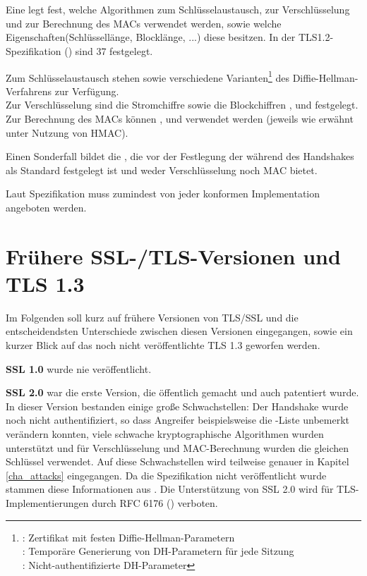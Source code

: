 \section{\ciphersuites{}}

Eine \ciphersuite{} legt fest, welche Algorithmen zum Schlüsselaustausch, zur Verschlüsselung und zur Berechnung des MACs verwendet werden, sowie welche Eigenschaften(Schlüssellänge, Blocklänge, ...) diese besitzen. In der TLS1.2-Spezifikation (\cite{tls12}) sind 37 \ciphersuites{} festgelegt.

Zum Schlüsselaustausch stehen  sowie verschiedene Varianten\footnote{
	: Zertifikat mit festen Diffie-Hellman-Parametern\\ 
	: Temporäre Generierung von DH-Parametern für jede Sitzung \\
	:  Nicht-authentifizierte DH-Parameter
} des Diffie-Hellman-Verfahrens zur Verfügung. \\
Zur Verschlüsselung sind die Stromchiffre  sowie die Blockchiffren ,  und  festgelegt. \\
Zur Berechnung des MACs können ,  und  verwendet werden (jeweils wie erwähnt unter Nutzung von HMAC).

Einen Sonderfall bildet die \ciphersuite{} , die vor der Festlegung der \ciphersuite{} während des Handshakes als Standard festgelegt ist und weder Verschlüsselung noch MAC bietet.

Laut Spezifikation muss zumindest  von jeder konformen Implementation angeboten werden.

\section{Frühere SSL-/TLS-Versionen und TLS 1.3}

Im Folgenden soll kurz auf frühere Versionen von TLS/SSL und die entscheidendsten Unterschiede zwischen diesen Versionen eingegangen, sowie ein kurzer Blick auf das noch nicht veröffentlichte TLS 1.3 geworfen werden.

\textbf{SSL 1.0} wurde nie veröffentlicht.

\textbf{SSL 2.0} war die erste Version, die öffentlich gemacht und auch patentiert wurde. In dieser Version bestanden einige große Schwachstellen: Der Handshake wurde noch nicht authentifiziert, so dass Angreifer beispielsweise die \ciphersuite-Liste unbemerkt verändern konnten, viele schwache kryptographische Algorithmen wurden unterstützt und für Verschlüsselung und MAC-Berechnung wurden die gleichen Schlüssel verwendet. Auf diese Schwachstellen wird teilweise genauer in Kapitel \ref{cha_attacks} eingegangen. Da die Spezifikation nicht veröffentlicht wurde stammen diese Informationen aus \cite{meyer14}. Die Unterstützung von SSL 2.0 wird für TLS-Implementierungen durch RFC 6176 (\cite{prohibit_ssl20}) verboten.

